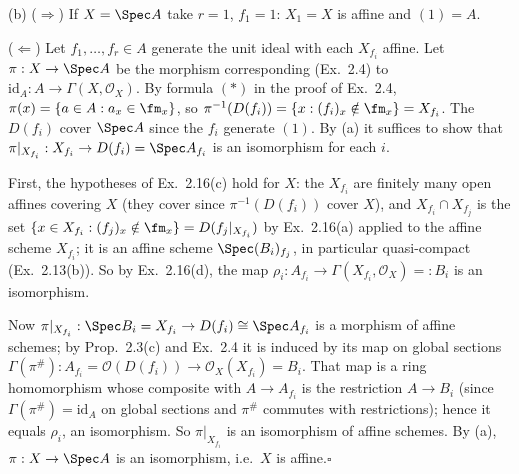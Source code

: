 \documentclass[11pt]{article}
\begin{document}
(b) ($\Rightarrow$) If $X=\Spec A$ take $r=1$, $f_1=1$: $X_1=X$ is affine and $(1)=A$.

($\Leftarrow$) Let $f_1,\dots,f_r\in A$ generate the unit ideal with each $X_{f_i}$ affine. Let $\pi:X\to\Spec A$ be the morphism corresponding (Ex.~2.4) to $\mathrm{id}_A:A\to\Gamma(X,\mathcal O_X)$. By formula $(*)$ in the proof of Ex.~2.4, $\pi(x)=\{a\in A:a_x\in\fm_x\}$, so $\pi^{-1}(D(f_i))=\{x:(f_i)_x\notin\fm_x\}=X_{f_i}$. The $D(f_i)$ cover $\Spec A$ since the $f_i$ generate $(1)$. By (a) it suffices to show that $\pi|_{X_{f_i}}:X_{f_i}\to D(f_i)=\Spec A_{f_i}$ is an isomorphism for each $i$.

First, the hypotheses of Ex.~2.16(c) hold for $X$: the $X_{f_i}$ are finitely many open affines covering $X$ (they cover since $\pi^{-1}(D(f_i))$ cover $X$), and $X_{f_i}\cap X_{f_j}$ is the set $\{x\in X_{f_i}:(f_j)_x\notin\fm_x\}=D(f_j|_{X_{f_i}})$ by Ex.~2.16(a) applied to the affine scheme $X_{f_i}$; it is an affine scheme $\Spec(B_i)_{f_j}$, in particular quasi-compact (Ex.~2.13(b)). So by Ex.~2.16(d), the map $\rho_i:A_{f_i}\to\Gamma(X_{f_i},\mathcal O_X)=:B_i$ is an isomorphism.

Now $\pi|_{X_{f_i}}:\Spec B_i=X_{f_i}\to D(f_i)\cong\Spec A_{f_i}$ is a morphism of affine schemes; by Prop.~2.3(c) and Ex.~2.4 it is induced by its map on global sections $\Gamma(\pi^\#):A_{f_i}=\mathcal O(D(f_i))\to\mathcal O_X(X_{f_i})=B_i$. That map is a ring homomorphism whose composite with $A\to A_{f_i}$ is the restriction $A\to B_i$ (since $\Gamma(\pi^\#)=\mathrm{id}_A$ on global sections and $\pi^\#$ commutes with restrictions); hence it equals $\rho_i$, an isomorphism. So $\pi|_{X_{f_i}}$ is an isomorphism of affine schemes. By (a), $\pi:X\to\Spec A$ is an isomorphism, i.e.\ $X$ is affine.\hfill$\square$
\end{document}
